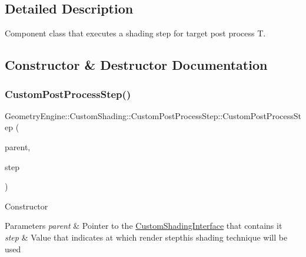 \subsection{Detailed Description}
Component class that executes a shading step for target post process T. 

\subsection{Constructor \& Destructor Documentation}
\mbox{\label{class_geometry_engine_1_1_custom_shading_1_1_custom_post_process_step_a3b1d958842bb403870e97a6bd6bf80bf}} 
\subsubsection{\texorpdfstring{CustomPostProcessStep()}{CustomPostProcessStep()}\hspace{0.1cm}{\footnotesize\ttfamily [1/2]}}
{\footnotesize\ttfamily Geometry\+Engine\+::\+Custom\+Shading\+::\+Custom\+Post\+Process\+Step\+::\+Custom\+Post\+Process\+Step (\begin{DoxyParamCaption}\item[{\mbox{\hyperlink{class_geometry_engine_1_1_custom_shading_1_1_custom_post_process_step_interface}{Custom\+Post\+Process\+Step\+Interface}} $\ast$}]{parent,  }\item[{\mbox{\hyperlink{namespace_geometry_engine_1_1_custom_shading_a09e44ca81de5fe08c6d50271d680c4b1}{Custom\+Post\+Process\+Steps}}}]{step }\end{DoxyParamCaption})}

Constructor 
\begin{DoxyParams}{Parameters}
{\em parent} & Pointer to the \mbox{\hyperlink{class_geometry_engine_1_1_custom_shading_1_1_custom_shading_interface}{Custom\+Shading\+Interface}} that contains it \\
\hline
{\em step} & Value that indicates at which render stepthis shading technique will be used \\
\hline
\end{DoxyParams}
\mbox{\label{class_geometry_engine_1_1_custom_shading_1_1_custom_post_process_step_a9f86e6e457de8c5d855ce36072340300}} 
